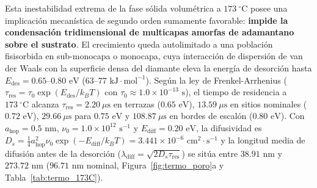 \documentclass[10pt,twocolumn,a4paper]{article}
\begin{document}
Esta inestabilidad extrema de la fase sólida volumétrica a $173\ ^\circ\text{C}$ posee una implicación mecanística de segundo orden sumamente favorable: \textbf{impide la condensación tridimensional de multicapas amorfas de adamantano sobre el sustrato}. El crecimiento queda autolimitado a una población fisisorbida en sub-monocapa o monocapa, cuya interacción de dispersión de van der Waals con la superficie densa del diamante eleva la energía de desorción hasta $E_{\text{des}} = 0.65\text{--}0.80\text{ eV}$ ($63\text{--}77\text{ kJ}\cdot\text{mol}^{-1}$). Según la ley de Frenkel-Arrhenius ($\tau_{\text{res}} = \tau_0 \exp(E_{\text{des}}/k_B T)$ con $\tau_0 \approx 1.0 \times 10^{-13}\text{ s}$), el tiempo de residencia a $173\ ^\circ\text{C}$ alcanza $\tau_{\text{res}} = 2.20\ \mu\text{s}$ en terrazas ($0.65\text{ eV}$), $13.59\ \mu\text{s}$ en sitios nominales ($0.72\text{ eV}$), $29.66\ \mu\text{s}$ para $0.75\text{ eV}$ y $108.87\ \mu\text{s}$ en bordes de escalón ($0.80\text{ eV}$). Con $a_{\text{hop}} = 0.5\text{ nm}$, $\nu_0 = 1.0 \times 10^{12}\text{ s}^{-1}$ y $E_{\text{diff}} = 0.20\text{ eV}$, la difusividad es $D_s = \frac{1}{4}a_{\text{hop}}^2 \nu_0 \exp(-E_{\text{diff}}/k_B T) = 3.441 \times 10^{-6}\text{ cm}^2\cdot\text{s}^{-1}$ y la longitud media de difusión antes de la desorción ($\lambda_{\text{diff}} = \sqrt{2 D_s \tau_{\text{res}}}$) se sitúa entre $38.91\text{ nm}$ y $273.72\text{ nm}$ ($96.71\text{ nm}$ nominal, Figura~\ref{fig:termo_poro}a y Tabla~\ref{tab:termo_173C}).
\end{document}

